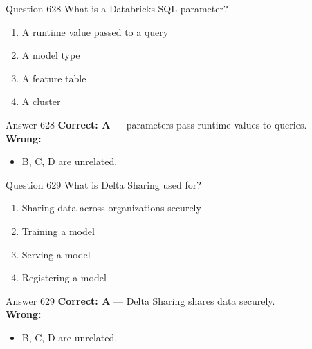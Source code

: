 \documentclass[aspectratio=169,11pt]{beamer}
\begin{document}
	\begin{frame}{Question 628}
		What is a Databricks SQL parameter?
		\begin{enumerate}[label=\Alph*.]
			\item A runtime value passed to a query
			\item A model type
			\item A feature table
			\item A cluster
		\end{enumerate}
	\end{frame}
	\begin{frame}{Answer 628}
		\textbf{Correct: A} --- parameters pass runtime values to queries.\\
		\vspace{0.5em}
		\textbf{Wrong:}
		\begin{itemize}
			\item B, C, D are unrelated.
		\end{itemize}
	\end{frame}
	
	\begin{frame}{Question 629}
		What is Delta Sharing used for?
		\begin{enumerate}[label=\Alph*.]
			\item Sharing data across organizations securely
			\item Training a model
			\item Serving a model
			\item Registering a model
		\end{enumerate}
	\end{frame}
	\begin{frame}{Answer 629}
		\textbf{Correct: A} --- Delta Sharing shares data securely.\\
		\vspace{0.5em}
		\textbf{Wrong:}
		\begin{itemize}
			\item B, C, D are unrelated.
		\end{itemize}
	\end{frame}
	
\end{document}
